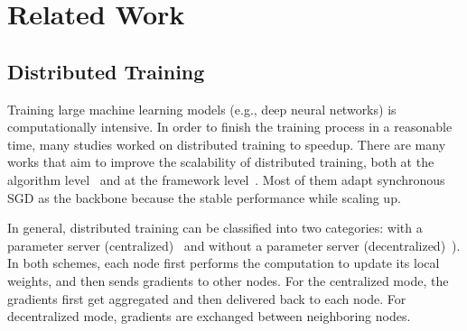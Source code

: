 \section{Related Work}
\subsection{Distributed Training} 
Training large machine learning models (e.g., deep neural networks) is computationally intensive. In order to finish the training process in a reasonable time, many studies worked on distributed training to speedup. There are many works that aim to improve the scalability of distributed training, both at the algorithm level~\cite{li2014scaling, dean2012large, recht2011hogwild, goyal2017accurate, jia2018highly} and at the framework level~\cite{chen2015mxnet, chainermn_mlsys2017, tensorflow2015-whitepaper, paszke2017pytorch, sergeev2018horovod}. 
Most of them adapt synchronous SGD as the backbone because the stable performance while scaling up.


In general, distributed training can be classified into two categories: with a parameter server (centralized)~\cite{li2014scaling, iandola2016firecaffe, kim2016deepspark} and without a parameter server (decentralized)~\cite{barney2010introduction_to_parallel_computing, patarasuk2009ring_all_reduce, sergeev2018horovod}). In both schemes, each node first performs the computation to update its local weights, and then sends gradients to other nodes. For the centralized mode, the gradients first get aggregated and then delivered back to each node. For decentralized mode, gradients are exchanged between neighboring nodes. 

